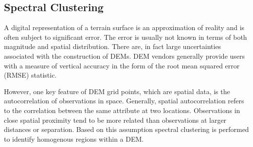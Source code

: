 \documentclass[12pt,letterpaper]{article}
\begin{document}
\subsection{Spectral Clustering}
A digital representation of a terrain surface is an approximation of reality and is often subject to significant 
error. The error is usually not known in terms of both magnitude and spatial distribution. There are, in fact 
large uncertainties associated with the construction of DEMs. DEM vendors generally provide users with a
measure of vertical accuracy in the form of the root mean squared error (RMSE) statistic. 

However, one key feature of 
 DEM grid points, which are spatial data, is the autocorrelation of observations in space.  Generally, spatial 
autocorrelation refers to the correlation between the same attribute at two locations. Observations in close 
spatial proximity tend to be more related than observations at larger distances or separation. Based on this
assumption spectral clustering is performed to identify homogenous regions within a DEM. %
\end{document}
